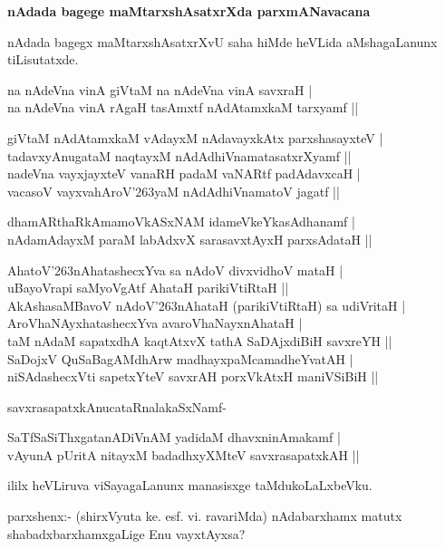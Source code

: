 {\bf nAdada bagege maMtarxshAsatxrXda parxmANavacana}

nAdada bagegx maMtarxshAsatxrXvU saha hiMde heVLida aMshagaLanunx tiLisutatxde.

\begin{shloka}
na nAdeVna vinA giVtaM na nAdeVna vinA savxraH |\\
na nAdeVna vinA rAgaH tasAmxtf nAdAtamxkaM tarxyamf ||
\end{shloka}

\begin{shloka}
giVtaM nAdAtamxkaM vAdayxM nAdavayxkAtx parxshasayxteV |\\
tadavxyAnugataM naqtayxM nAdAdhiVnamatasatxrXyamf ||\\
nadeVna vayxjayxteV vanaRH padaM vaNARtf padAdavxcaH |\\
vacasoV vayxvahAroV\char'263yaM nAdAdhiVnamatoV jagatf ||
\end{shloka}

\begin{shloka}
dhamARthaRkAmamoVkASxNAM idameVkeYkasAdhanamf |\\
nAdamAdayxM paraM labAdxvX sarasavxtAyxH parxsAdataH ||
\end{shloka}

\begin{shloka}
AhatoV\char'263nAhatashecxYva sa nAdoV divxvidhoV mataH |\\
uBayoVrapi saMyoVgAtf AhataH parikiVtiRtaH ||\\
AkAshasaMBavoV nAdoV\char'263nAhataH (parikiVtiRtaH) sa udiVritaH |\\
AroVhaNAyxhatashecxYva avaroVhaNayxnAhataH |\\
taM nAdaM sapatxdhA kaqtAtxvX tathA SaDAjxdiBiH savxreYH ||\\
SaDojxV QuSaBagAMdhArw madhayxpaMcamadheYvatAH |\\
niSAdashecxVti sapetxYteV savxrAH porxVkAtxH maniVSiBiH ||
\end{shloka}

savxrasapatxkAnucataRnalakaSxNamf-

\begin{shloka}
SaTfSaSiThxgatanADiVnAM yadidaM dhavxninAmakamf |\\
vAyunA pUritA nitayxM badadhxyXMteV savxrasapatxkAH ||
\end{shloka}

ililx heVLiruva viSayagaLanunx manasisxge taMdukoLaLxbeVku.

parxshenx:- (shirxVyuta ke. esf. vi. ravariMda) nAdabarxhamx matutx shabadxbarxhamxgaLige Enu vayxtAyxsa?

